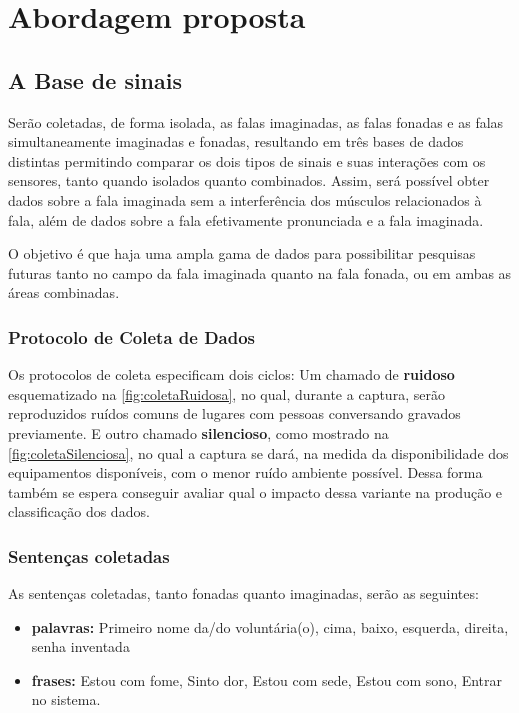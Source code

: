 \chapter{Abordagem proposta} \label{chap:propApproach}
	\section{A Base de sinais}
		\par Serão coletadas, de forma isolada, as falas imaginadas, as falas fonadas e as falas simultaneamente imaginadas e fonadas, resultando em três bases de dados distintas permitindo comparar os dois tipos de sinais e suas interações com os sensores, tanto quando isolados quanto combinados. Assim, será possível obter dados sobre a fala imaginada sem a interferência dos músculos relacionados à fala, além de dados sobre a fala efetivamente pronunciada e a fala imaginada.
		
		\par O objetivo é que haja uma ampla gama de dados para possibilitar pesquisas futuras tanto no campo da fala imaginada quanto na fala fonada, ou em ambas as áreas combinadas.
		
	    \subsection{Protocolo de Coleta de Dados}
	    	\label{sec:protocolDeColetaDeDados}
		    
		    \par Os protocolos de coleta especificam dois ciclos: Um chamado de \textbf{ruidoso} esquematizado na \autoref{fig:coletaRuidosa}, no qual, durante a captura, serão reproduzidos ruídos comuns de lugares com pessoas conversando gravados previamente. E outro chamado \textbf{silencioso}, como mostrado na \autoref{fig:coletaSilenciosa}, no qual a captura se dará, na medida da disponibilidade dos equipamentos disponíveis, com o menor ruído ambiente possível. Dessa forma também se espera conseguir avaliar qual o impacto dessa variante na produção e classificação dos dados.
		    
		    \subsection{Sentenças coletadas}
		    
			    \par As sentenças coletadas, tanto fonadas quanto imaginadas, serão as seguintes:
			    \begin{itemize}
			    	\item \textbf{palavras:} Primeiro nome da/do voluntária(o), cima, baixo, esquerda, direita, senha inventada
			    	\item \textbf{frases:} Estou com fome, Sinto dor, Estou com sede, Estou com sono, Entrar no sistema.
			    \end{itemize}
			    

